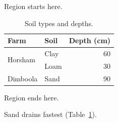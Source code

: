 \documentclass[11pt]{article}
\begin{document}
Region starts here.

\begin{table}[ht]
\centering
\caption{Soil types and depths.}\label{tab:soil}
\begin{tabular}{llr}
\toprule
Farm & Soil & Depth (cm) \\
\midrule
\multirow{2}{*}{Horsham} & Clay & 60 \\
 & Loam & 30 \\
Dimboola & Sand & 90 \\
\bottomrule
\end{tabular}
\end{table}

Region ends here.

Sand drains fastest (Table~\ref{tab:soil}).
\end{document}
